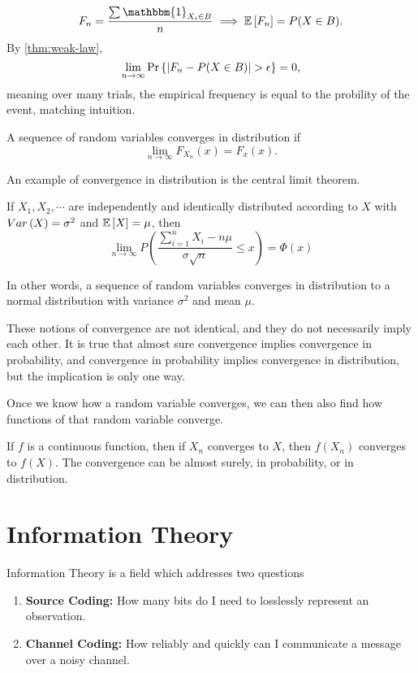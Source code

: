\[
  F_n = \frac{\sum\mathbbm{1}_{X_i\in B}}{n} \implies \expect{F_n} = P(X \in B).
\]
By \cref{thm:weak-law}, \[
  \lim_{n\to\infty}\text{Pr}\left\{|F_n - P(X\in B)| > \epsilon\right\} = 0,
\]
meaning over many trials, the empirical frequency is equal to the probility of the event, matching intuition.
\begin{definition}
	A sequence of random variables converges in distribution if \[
		\lim_{n\to\infty}F_{X_n}(x) = F_x(x).
	\]
	\label{defn:converge-dist}
\end{definition}
An example of convergence in distribution is the central limit theorem.
\begin{theorem}
	If $X_1, X_2, \cdots$ are independently and identically distributed according to $X$ with $Var\left(X\right) = \sigma^2$ and $\mathbb{E}\left[X\right] = \mu$, then
	\[
		\lim_{n\to\infty}P\left(\frac{\sum_{i=1}^nX_i - n\mu}{\sigma\sqrt{n}} \leq x\right) = \Phi(x)
	\]
	\label{thm:central-limit}
\end{theorem}
In other words, a sequence of random variables converges in distribution to a normal distribution with variance $\sigma^2$ and mean $\mu$.

These notions of convergence are not identical, and they do not necessarily imply each other.
It is true that almost sure convergence implies convergence in probability, and convergence in probability implies convergence in distribution, but the implication is only one way.

Once we know how a random variable converges, we can then also find how functions of that random variable converge.
\begin{theorem}
	If $f$ is a continuous function, then if $X_n$ converges to $X$, then $f(X_n)$ converges to $f(X)$. The convergence can be almost surely, in probability, or in distribution.
	\label{thm:continuous-mapping}
\end{theorem}
\section{Information Theory}
Information Theory is a field which addresses two questions
\begin{enumerate}
	\item \textbf{Source Coding:} How many bits do I need to losslessly represent an observation.
	\item \textbf{Channel Coding:} How reliably and quickly can I communicate a message over a noisy channel.
\end{enumerate}
